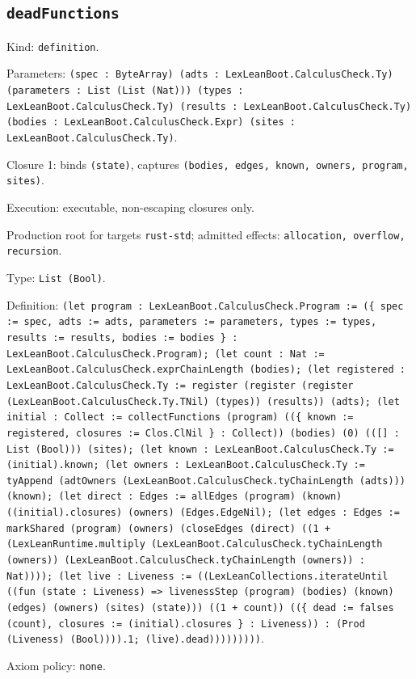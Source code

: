 \documentclass[11pt]{article}
\begin{document}
\subsection*{\texttt{deadFunctions}}
\noindent Kind: \texttt{definition}.\par
\noindent Parameters: \texttt{(spec : ByteArray) (adts : LexLeanBoot.CalculusCheck.Ty) (parameters : List (List (Nat))) (types : LexLeanBoot.CalculusCheck.Ty) (results : LexLeanBoot.CalculusCheck.Ty) (bodies : LexLeanBoot.CalculusCheck.Expr) (sites : LexLeanBoot.CalculusCheck.Ty)}.\par
\noindent Closure 1: binds \texttt{(state)}, captures \texttt{(bodies, edges, known, owners, program, sites)}.\par
\noindent Execution: executable, non-escaping closures only.\par
\noindent Production root for targets \texttt{rust-std}; admitted effects: \texttt{allocation, overflow, recursion}.\par
\noindent Type: \texttt{List (Bool)}.\par
\noindent Definition: \texttt{(let program : LexLeanBoot.CalculusCheck.Program := (\{ spec := spec, adts := adts, parameters := parameters, types := types, results := results, bodies := bodies \} : LexLeanBoot.CalculusCheck.Program); (let count : Nat := LexLeanBoot.CalculusCheck.exprChainLength (bodies); (let registered : LexLeanBoot.CalculusCheck.Ty := register (register (register (LexLeanBoot.CalculusCheck.Ty.TNil) (types)) (results)) (adts); (let initial : Collect := collectFunctions (program) ((\{ known := registered, closures := Clos.ClNil \} : Collect)) (bodies) (0) (([] : List (Bool))) (sites); (let known : LexLeanBoot.CalculusCheck.Ty := (initial).known; (let owners : LexLeanBoot.CalculusCheck.Ty := tyAppend (adtOwners (LexLeanBoot.CalculusCheck.tyChainLength (adts))) (known); (let direct : Edges := allEdges (program) (known) ((initial).closures) (owners) (Edges.EdgeNil); (let edges : Edges := markShared (program) (owners) (closeEdges (direct) ((1 + (LexLeanRuntime.multiply (LexLeanBoot.CalculusCheck.tyChainLength (owners)) (LexLeanBoot.CalculusCheck.tyChainLength (owners)) : Nat)))); (let live : Liveness := ((LexLeanCollections.iterateUntil ((fun (state : Liveness) => livenessStep (program) (bodies) (known) (edges) (owners) (sites) (state))) ((1 + count)) ((\{ dead := falses (count), closures := (initial).closures \} : Liveness)) : (Prod (Liveness) (Bool)))).1; (live).dead)))))))))}.\par
\noindent Axiom policy: \texttt{none}.\par
\end{document}
